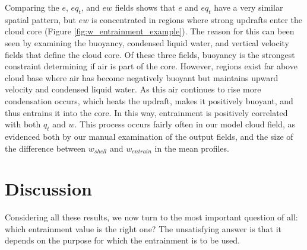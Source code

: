 \documentclass[12pt]{article}
\begin{document}
Comparing the $e$, $eq_t$, and $ew$ fields shows that $e$ and $eq_t$ 
have a very similar spatial pattern, but $ew$ is concentrated in regions 
where strong updrafts enter the cloud core 
(Figure \ref{fig:w_entrainment_example}).  The reason for this can been 
seen by examining the buoyancy, condensed liquid water, and vertical 
velocity fields that define the cloud core.  Of these three fields,
buoyancy is the strongest constraint determining if air is part of the 
core.  However, regions exist far above cloud base where air has become 
negatively buoyant but maintains upward velocity and condensed liquid 
water.  As this air continues to rise more condensation occurs, which 
heats the updraft, makes it positively buoyant, and thus entrains it 
into the core.  In this way, entrainment is positively correlated with 
both $q_t$ and $w$.  This process occurs fairly often in our model cloud 
field, as evidenced both by our manual examination of the output fields, 
and the size of the difference between $w_{shell}$ and $w_{entrain}$ in 
the mean profiles.


\section{Discussion}

Considering all these results, we now turn to the most important question 
of all: which entrainment value is the right one?  The unsatisfying 
answer is that it depends on the purpose for which the entrainment is to 
be used.
\end{document}
